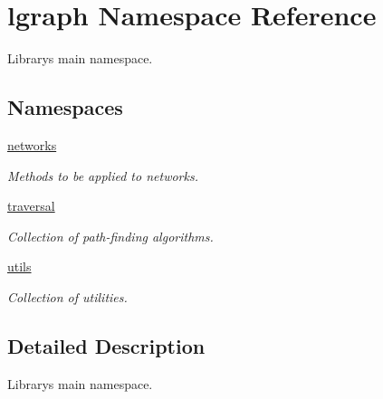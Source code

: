 \hypertarget{namespacelgraph}{}\section{lgraph Namespace Reference}
\label{namespacelgraph}


Library\textquotesingle{}s main namespace.  


\subsection*{Namespaces}
\begin{DoxyCompactItemize}
\item 
 \hyperlink{namespacelgraph_1_1networks}{networks}
\begin{DoxyCompactList}\small\item\em Methods to be applied to networks. \end{DoxyCompactList}\item 
 \hyperlink{namespacelgraph_1_1traversal}{traversal}
\begin{DoxyCompactList}\small\item\em Collection of path-\/finding algorithms. \end{DoxyCompactList}\item 
 \hyperlink{namespacelgraph_1_1utils}{utils}
\begin{DoxyCompactList}\small\item\em Collection of utilities. \end{DoxyCompactList}\end{DoxyCompactItemize}


\subsection{Detailed Description}
Library\textquotesingle{}s main namespace. 